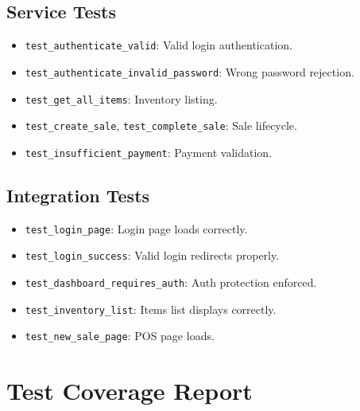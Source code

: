 \subsection{Service Tests}

\begin{itemize}[leftmargin=1.2cm]
  \item \texttt{test\_authenticate\_valid}: Valid login authentication.
  \item \texttt{test\_authenticate\_invalid\_password}: Wrong password rejection.
  \item \texttt{test\_get\_all\_items}: Inventory listing.
  \item \texttt{test\_create\_sale}, \texttt{test\_complete\_sale}: Sale lifecycle.
  \item \texttt{test\_insufficient\_payment}: Payment validation.
\end{itemize}

\subsection{Integration Tests}

\begin{itemize}[leftmargin=1.2cm]
  \item \texttt{test\_login\_page}: Login page loads correctly.
  \item \texttt{test\_login\_success}: Valid login redirects properly.
  \item \texttt{test\_dashboard\_requires\_auth}: Auth protection enforced.
  \item \texttt{test\_inventory\_list}: Items list displays correctly.
  \item \texttt{test\_new\_sale\_page}: POS page loads.
\end{itemize}

\section{Test Coverage Report}

